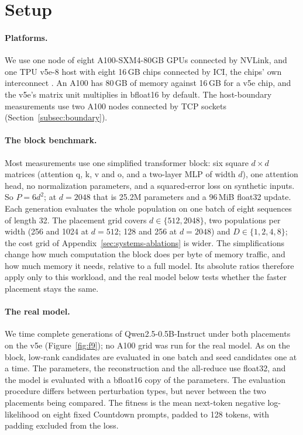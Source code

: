 \section{Setup}
\label{sec:setup}

\paragraph{Platforms.} We use one node of eight A100-SXM4-80GB GPUs connected by NVLink,
and one TPU v5e-8 host with eight 16\,GB chips connected by ICI, the chips' own
interconnect \citep{nvidiaA100,tpuv5e}. An A100 has 80\,GB of memory against 16\,GB for a
v5e chip, and the v5e's matrix unit multiplies in bfloat16 by default. The host-boundary
measurements use two A100 nodes connected by TCP sockets (Section~\ref{subsec:boundary}).

\paragraph{The block benchmark.} Most measurements use one simplified transformer block:
six square $d\times d$ matrices (attention q, k, v and o, and a two-layer MLP of width
$d$), one attention head, no normalization parameters, and a squared-error loss on
synthetic inputs. So $P = 6d^2$; at $d{=}2048$ that is 25.2M parameters and a 96\,MiB
float32 update. Each generation evaluates the whole population on one batch of eight
sequences of length 32. The placement grid covers $d\in\{512,2048\}$, two populations per
width (256 and 1024 at $d{=}512$; 128 and 256 at $d{=}2048$) and $D\in\{1,2,4,8\}$; the
cost grid of Appendix~\ref{sec:systems-ablations} is wider. The simplifications change how
much computation the block does per byte of memory traffic, and how much memory it needs,
relative to a full model. Its absolute ratios therefore apply only to this workload, and
the real model below tests whether the faster placement stays the same.

\paragraph{The real model.} We time complete generations of Qwen2.5-0.5B-Instruct
\citep{qwen25} under both placements on the v5e (Figure~\ref{fig:f9}); no A100 grid was
run for the real model. As on the block, low-rank candidates are evaluated in one batch and seed candidates
one at a time. The parameters, the reconstruction and the all-reduce use float32, and the
model is evaluated with a bfloat16 copy of the parameters. The evaluation procedure differs
between perturbation types, but never between the two placements being compared. The
fitness is the mean next-token negative log-likelihood on eight fixed Countdown prompts,
padded to 128 tokens, with padding excluded from the loss.

